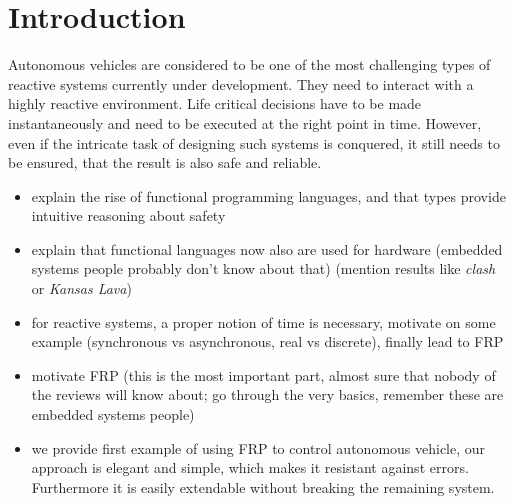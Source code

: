 \section{Introduction}

Autonomous vehicles are considered to be one of the most challenging
types of reactive systems currently under development. They need to
interact with a highly reactive environment. Life critical decisions
have to be made instantaneously and need to be executed at the right
point in time. However, even if the intricate task of designing such
systems is conquered, it still needs to be ensured, that the result is
also safe and reliable.



\begin{itemize}

\item explain the rise of functional programming languages, and that 
types provide intuitive reasoning about safety

\item explain that functional languages now also are used for hardware
  (embedded systems people probably don't know about that) (mention
  results like \emph{clash} or \emph{Kansas Lava})

\item for reactive systems, a proper notion of time is necessary,
  motivate on some example (synchronous vs asynchronous, real vs
  discrete), finally lead to FRP

\item motivate FRP (this is the most important part, almost sure that
  nobody of the reviews will know about; go through the very basics,
  remember these are embedded systems people)

\item we provide first example of using FRP to control autonomous
  vehicle, our approach is elegant and simple, which makes it
  resistant against errors. Furthermore it is easily extendable
  without breaking the remaining system.

\end{itemize}
